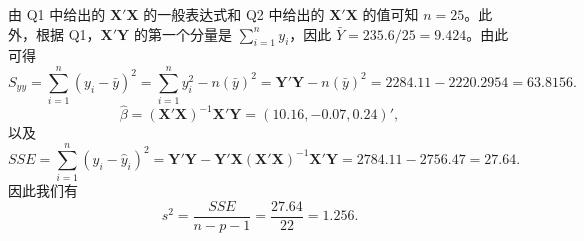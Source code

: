 \begin{questions}
\begin{solution}
由 Q1 中给出的 $\mathbf{X'X}$ 的一般表达式和 Q2 中给出的 $\mathbf{X'X}$ 的值可知 $n = 25$。此外，根据 Q1，$\mathbf{X'Y}$ 的第一个分量是 $\sum_{i=1}^{n} y_i$，因此 $\bar{Y} = 235.6/25 = 9.424$。由此可得
\[
S_{yy} = \sum_{i=1}^{n} (y_i - \bar{y})^2 = \sum_{i=1}^{n} y_i^2 - n(\bar{y})^2 = \mathbf{Y'Y} - n(\bar{y})^2 = 2284.11 - 2220.2954 = 63.8156.
\]
\[
\hat{\beta} = (\mathbf{X'X})^{-1} \mathbf{X'Y} = (10.16, -0.07, 0.24)',
\]
以及
\[
SSE = \sum_{i=1}^{n} (y_i - \hat{y}_i)^2 = \mathbf{Y'Y} - \mathbf{Y'X}(\mathbf{X'X})^{-1} \mathbf{X'Y} = 2784.11 - 2756.47 = 27.64.
\]
因此我们有
\[
s^2 = \frac{SSE}{n - p - 1} = \frac{27.64}{22} = 1.256.
\]
\end{solution}




\end{questions}
